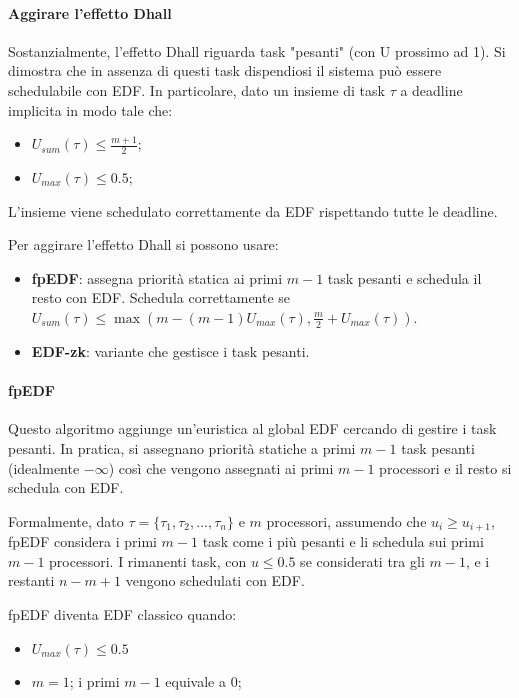 \documentclass[11pt,a4paper]{report}
\begin{document}
\paragraph{Aggirare l'effetto Dhall} Sostanzialmente, l'effetto Dhall riguarda task "pesanti" (con U prossimo ad 1). Si dimostra che in assenza di questi task dispendiosi il sistema può essere schedulabile con EDF. In particolare, dato un insieme di task $\tau$ a deadline
implicita in modo tale che:

\begin{itemize}
    \item $U_{sum}(\tau) \leq \frac{m+1}{2}$;
    \item $U_{max}(\tau) \leq 0.5 $;
\end{itemize}
L'insieme viene schedulato correttamente da EDF rispettando tutte le deadline.

Per aggirare l'effetto Dhall si possono usare:
\begin{itemize}
    \item \textbf{fpEDF}: assegna priorità statica ai primi $m-1$ task pesanti e schedula il resto con EDF. Schedula correttamente se $U_{sum}(\tau) \le \max(m - (m-1)U_{max}(\tau), \frac{m}{2} + U_{max}(\tau))$.
    \item \textbf{EDF-zk}: variante che gestisce i task pesanti.
\end{itemize}

\paragraph{fpEDF} Questo algoritmo aggiunge un'euristica al global EDF cercando di gestire i task pesanti. In pratica, si assegnano priorità statiche a primi $m - 1$ task pesanti (idealmente $-\infty$) così che vengono assegnati ai primi $m - 1$ processori e il resto si schedula con EDF.

Formalmente, dato $\tau = \{\tau_1, \tau_2, ..., \tau_n\}$ e $m$ processori, assumendo che $u_i\geq u_{i+1}$, fpEDF considera i primi $m - 1$ task come i più pesanti e li schedula sui primi $m - 1$ processori. I rimanenti task, con $u\leq 0.5$ se considerati tra gli $m - 1$, e i restanti $n - m + 1$ vengono schedulati con EDF.

fpEDF diventa EDF classico quando:
\begin{itemize}
    \item $U_{max}(\tau) \leq 0.5$
    \item $m=1$; i primi $m-1$ equivale a $0$;
\end{itemize}
\end{document}
